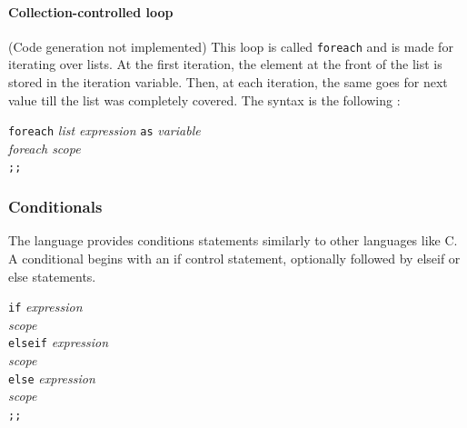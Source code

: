\documentclass[a4paper,11pt]{article}
\begin{document}
\paragraph{Collection-controlled loop} (Code generation not implemented) This loop is called \texttt{foreach} and is made for iterating over lists. At the first iteration, the element at the front of the list is stored in the iteration variable. Then, at each iteration, the same goes for next value till the list was completely covered. The syntax is the following :
\begin{center}
	\begin{minipage}{0.35\linewidth}
		\texttt{foreach} \textit{list expression} \texttt{as} \textit{variable} \\
				\text{ }\text{ }\text{ }\text{ }\textit{foreach scope}\\
		\texttt{;;}\\
	\end{minipage}
\end{center}
\subsubsection{Conditionals}
The language provides conditions statements similarly to other languages like C. A conditional begins with an if control statement, optionally followed by elseif or else statements. 
\begin{center}
	\begin{minipage}{0.35\linewidth}
		\texttt{if} \textit{expression} \\
				\text{ }\text{ }\text{ }\text{ }\textit{scope}\\
		\texttt{elseif} \textit{expression} \\
				\text{ }\text{ }\text{ }\text{ }\textit{scope}\\
		\texttt{else} \textit{expression} \\
				\text{ }\text{ }\text{ }\text{ }\textit{scope}\\
		\texttt{;;}\\
	\end{minipage}
\end{center}
\end{document}

